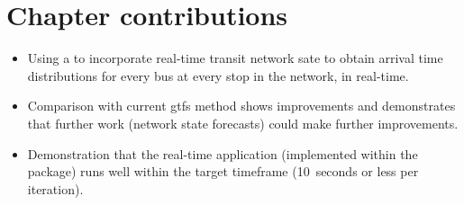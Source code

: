\section{Chapter contributions}
\label{sec:pred_contrib}

\begin{itemize}
\item Using a \pf{} to incorporate real-time transit network sate to obtain arrival time distributions for every bus at every stop in the network, in real-time.

\item Comparison with current \gls{gtfs} method shows improvements and demonstrates that further work (network state forecasts) could make further improvements.

\item Demonstration that the real-time application (implemented within the  package) runs well within the target timeframe (10~seconds or less per iteration).
\end{itemize}
